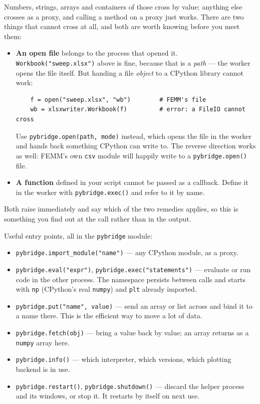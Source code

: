 Numbers, strings, arrays and containers of those cross by value; anything else
crosses as a proxy, and calling a method on a proxy just works.  There are two
things that cannot cross at all, and both are worth knowing before you meet
them:

\begin{itemize}
\item{\bf An open file} belongs to the process that opened it.
{\tt Workbook("sweep.xlsx")} above is fine, because that is a {\em path} ---
the worker opens the file itself.  But handing a file {\em object} to a
CPython library cannot work:

\begin{verbatim}
    f = open("sweep.xlsx", "wb")        # FEMM's file
    wb = xlsxwriter.Workbook(f)         # error: a FileIO cannot cross
\end{verbatim}

\noindent
Use \verb+pybridge.open(path, mode)+ instead, which opens the file in the
worker and hands back something CPython can write to.  The reverse direction
works as well: FEMM's own {\tt csv} module will happily write to a
{\tt pybridge.open()} file.

\item{\bf A function} defined in your script cannot be passed as a callback.
Define it in the worker with {\tt pybridge.exec()} and refer to it by name.
\end{itemize}

\noindent
Both raise immediately and say which of the two remedies applies, so this is
something you find out at the call rather than in the output.

Useful entry points, all in the {\tt pybridge} module:

\begin{itemize}
\item{\tt pybridge.import\_module("name")} --- any CPython module, as a proxy.

\item{\tt pybridge.eval("expr")}, {\tt pybridge.exec("statements")} ---
evaluate or run code in the other process.  The namespace persists between
calls and starts with {\tt np} (CPython's real {\tt numpy}) and {\tt plt}
already imported.

\item{\tt pybridge.put("name", value)} --- send an array or list across and
bind it to a name there.  This is the efficient way to move a lot of data.

\item{\tt pybridge.fetch(obj)} --- bring a value back by value; an array
returns as a {\tt numpy} array here.

\item{\tt pybridge.info()} --- which interpreter, which versions, which
plotting backend is in use.

\item{\tt pybridge.restart()}, {\tt pybridge.shutdown()} --- discard the
helper process and its windows, or stop it.  It restarts by itself on next
use.
\end{itemize}

